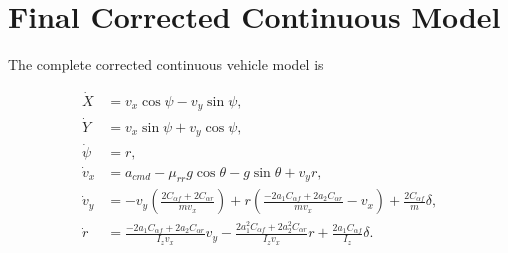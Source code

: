 \documentclass[12pt,a4paper]{article}
\begin{document}
\section{Final Corrected Continuous Model}

The complete corrected continuous vehicle model is

\begin{equation}
\boxed{
\begin{aligned}
\dot X
&=
v_x\cos\psi-v_y\sin\psi,
\\[2mm]
\dot Y
&=
v_x\sin\psi+v_y\cos\psi,
\\[2mm]
\dot\psi
&=
r,
\\[2mm]
\dot v_x
&=
a_{cmd}
-\mu_{rr}g\cos\theta
-g\sin\theta
+v_yr,
\\[2mm]
\dot v_y
&=
-v_y
\left(
\frac{2C_{\alpha f}+2C_{\alpha r}}
{mv_x}
\right)
+
r
\left(
\frac{-2a_1C_{\alpha f}+2a_2C_{\alpha r}}
{mv_x}
-v_x
\right)
+
\frac{2C_{\alpha f}}{m}\delta,
\\[2mm]
\dot r
&=
\frac{-2a_1C_{\alpha f}+2a_2C_{\alpha r}}
{I_zv_x}v_y
-
\frac{
2a_1^2C_{\alpha f}
+
2a_2^2C_{\alpha r}
}
{I_zv_x}r
+
\frac{2a_1C_{\alpha f}}{I_z}\delta.
\end{aligned}
}
\end{equation}
\end{document}
